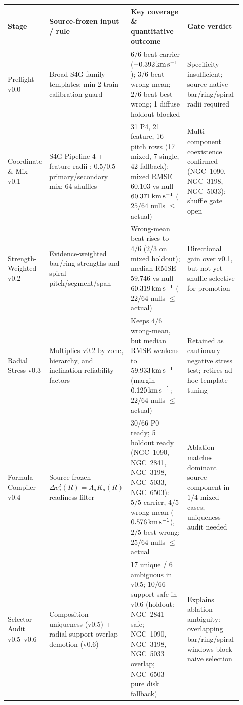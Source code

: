 \documentclass[11pt]{article}
\begin{document}
\begin{table}[htbp]
\centering
\scriptsize
\setlength{\tabcolsep}{3pt}
\begin{tabular}{L{0.12\linewidth}L{0.25\linewidth}L{0.29\linewidth}L{0.26\linewidth}}
\toprule
Stage & Source-frozen input / rule & Key coverage \& quantitative outcome & Gate verdict\\
\midrule
Preflight v0.0 & Broad S4G family templates; min-2 train calibration guard & \(6/6\) beat carrier (\(-0.392\,{\rm km\,s^{-1}}\)); \(3/6\) beat wrong-mean; \(2/6\) beat best-wrong; 1 diffuse holdout blocked & Specificity insufficient; source-native bar/ring/spiral radii required\\
Coordinate \& Mix v0.1 & S4G Pipeline 4 + feature radii \cite{Salo2015S4GPipeline4,HerreraEndoqui2015S4GFeatures}; \(0.5/0.5\) primary/secondary mix; 64 shuffles & 31 P4, 21 feature, 16 pitch rows (17 mixed, 7 single, 42 fallback); mixed RMSE \(60.103\) vs null \(60.371\,{\rm km\,s^{-1}}\) (\(25/64\) nulls \(\le\) actual) & Multi-component coexistence confirmed (NGC~1090, NGC~3198, NGC~5033); shuffle gate open\\
Strength-Weighted v0.2 & Evidence-weighted bar/ring strengths and spiral pitch/segment/span & Wrong-mean beat rises to \(4/6\) (\(2/3\) on mixed holdout); median RMSE \(59.746\) vs null \(60.319\,{\rm km\,s^{-1}}\) (\(22/64\) nulls \(\le\) actual) & Directional gain over v0.1, but not yet shuffle-selective for promotion\\
Radial Stress v0.3 & Multiplies v0.2 by zone, hierarchy, and inclination reliability factors & Keeps \(4/6\) wrong-mean, but median RMSE weakens to \(59.933\,{\rm km\,s^{-1}}\) (margin \(0.120\,{\rm km\,s^{-1}}\); \(22/64\) nulls \(\le\) actual) & Retained as cautionary negative stress test; retires ad-hoc template tuning\\
Formula Compiler v0.4 & Source-frozen \(\Delta v_a^2(R)=\Lambda_a K_a(R)\) readiness filter & \(30/66\) P0 ready; 5 holdout ready (NGC~1090, NGC~2841, NGC~3198, NGC~5033, NGC~6503): \(5/5\) carrier, \(4/5\) wrong-mean (\(0.576\,{\rm km\,s^{-1}}\)), \(2/5\) best-wrong; \(25/64\) nulls \(\le\) actual & Ablation matches dominant source component in \(1/4\) mixed cases; uniqueness audit needed\\
Selector Audit v0.5--v0.6 & Composition uniqueness (v0.5) + radial support-overlap demotion (v0.6) & \(17\) unique / \(6\) ambiguous in v0.5; \(10/66\) support-safe in v0.6 (holdout: NGC~2841 safe; NGC~1090, NGC~3198, NGC~5033 overlap; NGC~6503 pure disk fallback) & Explains ablation ambiguity: overlapping bar/ring/spiral windows block naive selection\\

\end{tabular}
\end{table}
\end{document}
